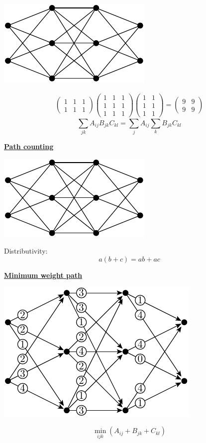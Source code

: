 \documentclass[11pt]{article}
\def\heading #1{\centerline{\underline{\bf\LARGE #1}}}
\def\vsp {\vskip 0.5cm}
\begin{document}
\vsp
\centerline{\includegraphics[]{pic-trellis.pdf}}
\begin{align*}
\begin{pmatrix}1&1&1\\1&1&1\end{pmatrix}
\begin{pmatrix}1&1&1\\1&1&1\\1&1&1\end{pmatrix}
\begin{pmatrix}1&1\\1&1\\1&1\end{pmatrix}
=\begin{pmatrix}9&9\\9&9\end{pmatrix}
\end{align*}
$$
    \sum_{jk} A_{ij} B_{jk} C_{kl}
    = \sum_{j} A_{ij} \sum_k B_{jk} C_{kl}
$$


\newpage %

\heading{Path counting}

\vsp
\centerline{\includegraphics[]{pic-trellis.pdf}}

Distributivity:
$$
    a(b + c) = ab + ac
$$
\vsp\vsp
\vsp\vsp

\newpage %

\heading{Minimum weight path}
\centerline{\includegraphics[]{pic-minpath-0.pdf}}
$$
    \min_{ijk} ( A_{ij} + B_{jk} + C_{kl} )
$$
\end{document}
